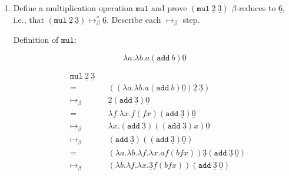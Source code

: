 \documentclass[11pt]{article}
\begin{document}
\begin{enumerate}
\begin{enumerate}
		            \newpage
		      \item Define a multiplication operation $\texttt{mul}$ and prove $(\texttt{mul} \: \underline{2} \: \underline{3})$ $\beta$-reduces to $\underline{6}$, i.e., that $(\texttt{mul} \: \underline{2} \: \underline{3}) \mapsto^*_\beta \underline{6}$. Describe each $\mapsto_\beta$ step.


		            Definition of $ \texttt{mul}$:

		            $$
			            \lambda a. \lambda b. a ( \texttt{add} \: b) \underline{0}
		            $$

		            \begin{align*}
			             &  & \texttt{mul} \: \underline{2} \: \underline{3} &                                                                                                                                        \\
			             &  & =                                              &   & (( \lambda a. \lambda b. a ( \texttt{add} \: b) \underline{0} ) \underline{2} \: \underline{3} )                                 & \\
			             &  & \mapsto_\beta                                  &   & \underline{2} ( \texttt{add}  \:\underline{3} ) \underline{0}                                                                    & \\
			             &  & =                                              &   & \lambda f. \lambda x. f( f x)( \texttt{add}  \:\underline{3} ) \underline{0}                                                     & \\
			             &  & \mapsto_\beta                                  &   & \lambda x. ( \texttt{add}  \:\underline{3} )(( \texttt{add}  \:\underline{3} ) x) \underline{0}                                  & \\
			             &  & \mapsto_\beta                                  &   & ( \texttt{add}  \:\underline{3} )(( \texttt{add} \: \underline{3} ) \underline{0} )                                              & \\
			             &  & =                                              &   & ( \lambda a. \lambda b. \lambda f. \lambda x. a f ( b f x)) \underline{3} ( \texttt{add}  \:\underline{3}  \:\underline{0} )     & \\
			             &  & \mapsto_\beta                                  &   & ( \lambda b. \lambda f. \lambda x. \underline{3} f( b f x))( \texttt{add}  \:\underline{3}  \:\underline{0} )                    & \\

\end{align*}
\end{enumerate}
\end{enumerate}
\end{document}
